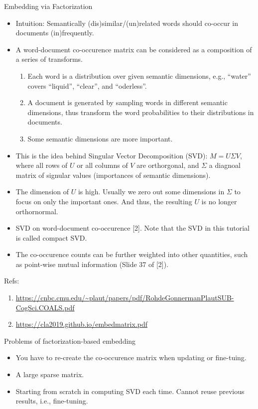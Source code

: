 \documentclass[11pt,handout]{beamer}
\begin{document}
\begin{frame}{Embedding via Factorization}
\begin{itemize}[<+->]
  \item Intuition: Semantically (dis)similar/(un)related words should co-occur in documents (in)frequently.
  \item A word-document co-occurence matrix can be considered as a composition 
   of a series of transforms. 
       \begin{enumerate}
         \item Each word is a distribution over given semantic dimensions, e.g., ``water'' covers ``liquid'', ``clear'', and ``oderless''.
         \item A document is generated by sampling words in different semantic dimensions, thus transform the word probabilities to their distributions in documents. 
         \item Some semantic dimensions are more important. 
       \end{enumerate}
  \item This is the idea behind Singular Vector Decomposition (SVD): $M = U\Sigma V$, where all rows of $U$ or all columns of $V$ are orthorgonal, and $\Sigma$ a diagnoal matrix of signular values (importances of semantic dimensions). 
  \item The dimension of $U$ is high. Usually we zero out some dimensions in $\Sigma$ to focus on only the important ones. And thus, the resulting $U$ is no longer orthornormal. 
  \item SVD on word-document co-occurence [2].  Note that the SVD in this tutorial is called compact SVD. 

  \item The co-occurence counts can be further weighted into other quantities, such as point-wise mutual information (Slide 37 of [2]). 
\end{itemize}

Refs: 
\begin{enumerate}
\item \url{https://cnbc.cmu.edu/~plaut/papers/pdf/RohdeGonnermanPlautSUB-CogSci.COALS.pdf}
\item  \url{https://cla2019.github.io/embedmatrix.pdf}
\end{enumerate}
\end{frame}
   

\begin{frame}{Problems of factorization-based embedding}
\begin{itemize}[<+->]
  \item You have to re-create the co-occurence matrix when updating or fine-tuing. 
  \item A large sparse matrix. 
  \item Starting from scratch in computing SVD each time. Cannot reuse previous results, i.e., fine-tuning. 
\end{itemize}
\end{frame}
\end{document}
